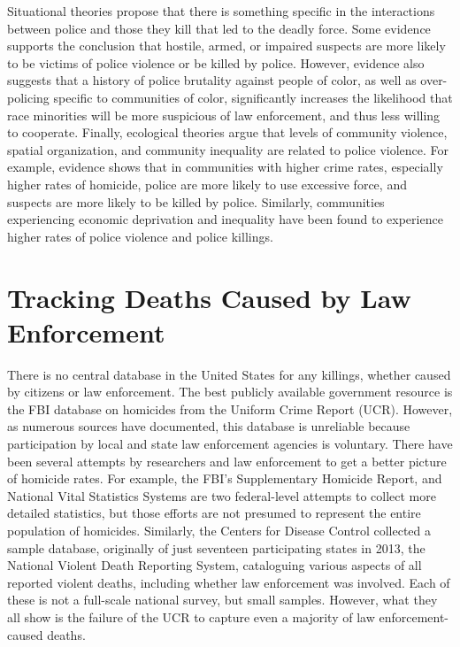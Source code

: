 \documentclass[sigconf]{acmart}
\begin{document}
Situational theories propose that there is something specific in the interactions between police and those they kill that led to the deadly force.  Some evidence supports the conclusion that hostile, armed, or impaired suspects are more likely to be victims of police violence or be killed by police.  \cite{nix17}  However, evidence also suggests that a history of police brutality against people of color, as well as over-policing specific to communities of color, significantly increases the likelihood that race minorities will be more suspicious of law enforcement, and thus less willing to cooperate. \cite{payne17,kent05} Finally, ecological theories argue that levels of community violence, spatial organization, and community inequality are related to police violence.  For example, evidence shows that in communities with higher crime rates, especially higher rates of homicide, police are more likely to use excessive force, and suspects are more likely to be killed by police. \cite{nix17,smith04,smith14}  Similarly, communities experiencing economic deprivation and inequality have been found to experience higher rates of police violence and police killings. \cite{jacobs02,meeks06,stults07,legewie15,payne17}

\section{Tracking Deaths Caused by Law Enforcement}
There is no central database in the United States for any killings, whether caused by citizens or law enforcement.  The best publicly available government resource is the FBI database on homicides from the Uniform Crime Report (UCR).  However, as numerous sources have documented, this database is unreliable because participation by local and state law enforcement agencies is voluntary. \cite{currie16,pridemore05,dalton17} There have been several attempts by researchers and law enforcement to get a better picture of homicide rates.  For example, the FBI's Supplementary Homicide Report, and National Vital Statistics Systems are two federal-level attempts to collect more detailed statistics, but those efforts are not presumed to represent the entire population of homicides. \cite{pridemore05}  Similarly, the Centers for Disease Control collected a sample database, originally of just seventeen participating states in 2013, the National Violent Death Reporting System, cataloguing various aspects of all reported violent deaths, including whether law enforcement was involved. \cite{cdc13}  Each of these is not a full-scale national survey, but small samples.  However, what they all show is the failure of the UCR to capture even a majority of law enforcement-caused deaths.
\end{document}
